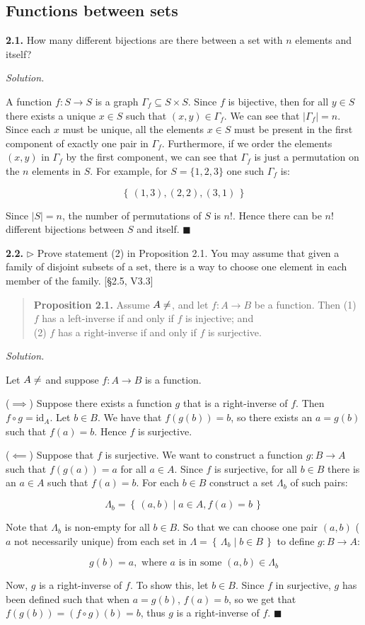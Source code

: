 \documentclass[14pt,parskip=full]{scrartcl}
\newcommand{\exercise}[3]{
\noindent
\textbf{#1.} #2

\noindent
\textit{Solution.}{\let\tpar\par \let\par\relax #3}
}
\newcommand{\set}[1]{\left\{\,#1\,\right\}}
\newcommand*{\QEDA}{\hfill\ensuremath{\blacksquare}}
\newcommand{\id}{\mathrm{id}}
\newcommand\abs[1]{\left|#1\right|}
\begin{document}
\subsection{Functions between sets}

\exercise
{2.1}{How many different bijections are there between a set with $n$ elements
and itself?}{

A function $f:S\to S$ is a graph $\Gamma_f\subseteq S\times S$. Since $f$ is
bijective, then for all $y\in S$ there exists a unique $x\in S$ such that
$(x,y)\in\Gamma_f$. We can see that $\abs{\Gamma_f} = n$. Since each $x$ must be
unique, all the elements $x\in S$ must be present in the first component of
exactly one pair in $\Gamma_f$. Furthermore, if we order the elements $(x,y)$ in
$\Gamma_f$ by the first component, we can see that $\Gamma_f$ is just a
permutation on the $n$ elements in $S$. For example, for $S=\{1,2,3\}$ one such
$\Gamma_f$ is:

\[ \set{ (1,3), (2,2), (3,1) } \]

Since $\abs{S} = n$, the number of permutations of $S$ is $n!$. Hence there can be
$n!$ different bijections between $S$ and itself.
\QEDA

}

\exercise
{2.2}{$\rhd$ Prove statement (2) in Proposition 2.1. You may assume that given a
family of disjoint subsets of a set, there is a way to choose one element in
each member of the family. [\S2.5, V3.3]

\begin{quote} \textbf{Proposition 2.1.} Assume $A\neq\empty$, and let $f:A\to B$ be a function. Then
(1) $f$ has a left-inverse if and only if $f$ is injective; and \\
(2) $f$ has a right-inverse if and only if $f$ is surjective.
\end{quote}}{

Let $A\neq\empty$ and suppose $f:A\to B$ is a function.

\tpar
($\implies$) Suppose there exists a function $g$ that is a right-inverse of $f$.
Then $f\circ g = \id_A$. Let $b\in B$. We have that $f(g(b)) = b$, so there
exists an $a = g(b)$ such that $f(a) = b$. Hence $f$ is surjective.

\tpar
($\impliedby$) Suppose that $f$ is surjective. We want to construct a function
$g:B\to A$ such that $f(g(a)) = a$ for all $a\in A$. Since $f$ is surjective,
for all $b\in B$ there is an $a\in A$ such that $f(a) = b$. For each $b\in B$
construct a set $\Lambda_b$ of such pairs:

\[ \Lambda_b = \set{ (a,b) \mid a \in A, f(a) = b } \]

Note that $\Lambda_b$ is non-empty for all $b\in B$. So that we can choose one
pair $(a,b)$ ($a$ not necessarily unique) from each set in $\Lambda =
\set{\Lambda_b\mid b\in B}$ to define $g:B\to A$:

\[ g(b) = a, \text{ where $a$ is in some $(a,b)\in\Lambda_b$} \]

Now, $g$ is a right-inverse of $f$. To show this, let $b\in B$. Since $f$ in
surjective, $g$ has been defined such that when $a=g(b)$, $f(a)=b$, so we get
that $f(g(b)) = (f\circ g)(b) = b$, thus $g$ is a right-inverse of $f$.
\QEDA

}
\end{document}
